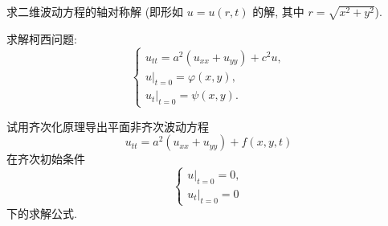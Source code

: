 \begin{exercise}
  求二维波动方程的轴对称解 (即形如 $u=u(r,t)$ 的解, 其中 $r=\sqrt{x^2+y^2}$).
\end{exercise}



\begin{exercise}
  求解柯西问题:
  \[\begin{cases}
    u_{tt} = a^2(u_{xx}+u_{yy}) + c^2u, \\
    u|_{t=0} = \varphi(x,y), \\
    u_t|_{t=0} = \psi(x,y).
  \end{cases}\]
\end{exercise}



\begin{exercise}[6]
  试用齐次化原理导出平面非齐次波动方程
  \[u_{tt} = a^2(u_{xx}+u_{yy})+f(x,y,t)\]
  在齐次初始条件
  \[\begin{cases}
    u|_{t=0} = 0, \\
    u_t|_{t=0} = 0
  \end{cases}\]
  下的求解公式.
\end{exercise}


